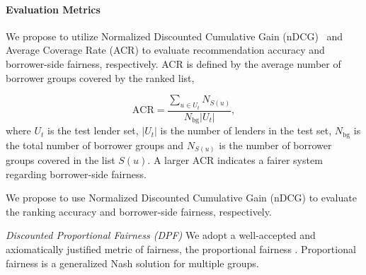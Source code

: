 \paragraph{\textbf{Evaluation Metrics}}

We propose to utilize Normalized Discounted Cumulative Gain (nDCG)~\cite{jarvelin2002cumulated} and Average Coverage Rate (ACR) to evaluate recommendation accuracy and borrower-side fairness, respectively. ACR is defined by the average number of borrower groups covered by the ranked list,


\begin{equation}
    \text{ACR}=\frac{\sum_{u\in U_t}N_{S(u)}}{N_\text{bg}|U_t|},
\end{equation}
where $U_t$ is the test lender set, $|U_t|$ is the number of lenders in the test set, $N_\text{bg}$ is the total number of borrower groups and $N_{S(u)}$ is the number of borrower groups covered in the list $S(u)$. A larger ACR indicates a fairer system regarding borrower-side fairness.

We propose to use Normalized Discounted Cumulative Gain (nDCG) to evaluate the ranking accuracy and borrower-side fairness, respectively.


\textit{Discounted Proportional Fairness (DPF)}
We adopt a well-accepted and axiomatically justified metric of fairness, the proportional fairness \cite{kelly1998rate}. Proportional fairness is a generalized Nash solution for multiple groups.

